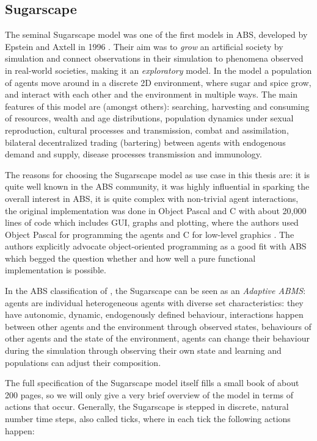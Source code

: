 \subsection{Sugarscape}
\label{sec:sugarscape}

The seminal Sugarscape model was one of the first models in ABS, developed by Epstein and Axtell in 1996 \cite{epstein_growing_1996}. Their aim was to \textit{grow} an artificial society by simulation and connect observations in their simulation to phenomena observed in real-world societies, making it an \textit{exploratory} model. In the model a population of agents move around in a discrete 2D environment, where sugar and spice grow, and interact with each other and the environment in multiple ways. The main features of this model are (amongst others): searching, harvesting and consuming of resources, wealth and age distributions, population dynamics under sexual reproduction, cultural processes and transmission, combat and assimilation, bilateral decentralized trading (bartering) between agents with endogenous demand and supply, disease processes transmission and immunology.

The reasons for choosing the Sugarscape model as use case in this thesis are: it is quite well known in the ABS community, it was highly influential in sparking the overall interest in ABS, it is quite complex with non-trivial agent interactions, the original implementation was done in Object Pascal and C with about 20,000 lines of code which includes GUI, graphs and plotting, where the authors used Object Pascal for programming the agents and C for low-level graphics \cite{axtell_aligning_1996}. The authors explicitly advocate object-oriented programming as a good fit with ABS which begged the question whether and how well a pure functional implementation is possible. 

In the ABS classification of \cite{macal_everything_2016}, the Sugarscape can be seen as an \textit{Adaptive ABMS}: agents are individual heterogeneous agents with diverse set characteristics: they have autonomic, dynamic, endogenously defined behaviour, interactions happen between other agents and the environment through observed states, behaviours of other agents and the state of the environment, agents can change their behaviour during the simulation through observing their own state and learning and populations can adjust their composition.

The full specification of the Sugarscape model itself fills a small book of about 200 pages, so we will only give a very brief overview of the model in terms of actions that occur. Generally, the Sugarscape is stepped in discrete, natural number time steps, also called ticks, where in each tick the following actions happen:

